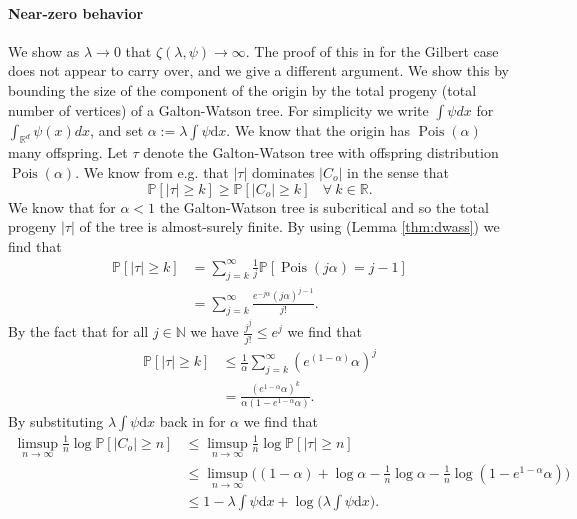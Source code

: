 \documentclass[a4paper,12pt]{scrartcl}
\newcommand{\conn}{\psi}
\renewcommand{\P}{\mathbb{P}}
\renewcommand{\d}{\mathrm{d}}
\newcommand{\nats}{\mathbb{N}}
\newcommand{\Pois}{\operatorname{Pois}}
\theoremstyle{definition}
\theoremstyle{remark}
\begin{document}
  \paragraph{Near-zero behavior}
  We show as $\lambda\to 0$ that $\zeta(\lambda, \conn)\to\infty$.
  The proof of this in \cite{penrose2003random} for the Gilbert case does not
  appear to carry over, and we give a different argument.
  We show this by bounding the size of the component of the origin by the total progeny (total number of vertices) of a Galton-Watson tree.
  For simplicity we write
  $\int \psi dx$ for $\int_{\mathbb R^d} \psi(x)dx$, and set
  $\alpha :=\lambda\int\conn\d x$.
  We know
  that the origin has
  $\Pois(\alpha)$
  many offspring.
  Let $\tau$ denote the Galton-Watson tree with offspring distribution $\Pois(\alpha)$. We know
  from e.g.  \cite{spread-out}
  that $|\tau|$ dominates $|C_o|$ in the sense that
  \begin{equation}
    \P[|\tau|\geq k]\geq \P[|C_o|\geq k] ~~~~ \forall ~ k \in \mathbb R.
  \end{equation}
  We know that for $\alpha<1$ the Galton-Watson tree is subcritical and so the total progeny $|\tau|$ of the tree is almost-surely finite.
  By using  (Lemma \ref{thm:dwass}) we find that
  \begin{equation}
    \begin{aligned}
      \P[|\tau|\geq k]
      & =
      \sum_{j=k}^\infty
      \frac1j\P[\Pois(j\alpha)=j-1] \\
      & =
      \sum_{j=k}^\infty
      \frac{
        e^{-j\alpha}(j\alpha)^{j-1}
      }{
        j!
      }.
    \end{aligned}
  \end{equation}
  By the fact that for all $j\in\nats$ we have $\frac{j^j}{j!}\leq e^j$ we find that
  \begin{equation}
    \begin{aligned}
      \P[|\tau|\geq k]
      & \leq
      \frac1\alpha
      \sum_{j=k}^\infty
      (e^{(1-\alpha)}\alpha)^j \\
      & =
      \frac{
        (e^{1-\alpha}\alpha)^k
      }{
        \alpha(1-e^{1-\alpha}\alpha)
      }.
    \end{aligned}
  \end{equation}
  By substituting $\lambda\int\conn\d x$ back in for $\alpha$ we find that
  \begin{equation}
    \begin{aligned}
      \limsup_{n\to\infty}
      \frac1n \log \P[|C_o|\geq n]
      & \leq
      \limsup_{n\to\infty}
      \frac1n \log \P[|\tau|\geq n] \\
      & \leq
      \limsup_{n\to\infty}
      \Big(
        (1-\alpha)
        + \log\alpha
        -\frac1n \log\alpha
        -\frac1n \log(1-e^{1-\alpha}\alpha)
      \Big)                         \\
      & \leq
      1-\lambda\int\psi\d x + \log\big(\lambda \int \psi \d x\big).
    \end{aligned}
  \end{equation}
\end{document}
